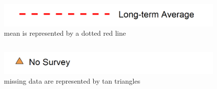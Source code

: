 \documentclass[
]{book}
\begin{document}
\begin{columns-nocenter}

\begin{column}

\begin{figure}
\includegraphics[width=15.25in]{figures/mline} \caption{mean is represented by a dotted red line}\label{fig:unnamed-chunk-177}
\end{figure}

\end{column}

\begin{column}

\begin{figure}
\includegraphics[width=15.25in]{figures/mpoint} \caption{missing data are represented by tan triangles}\label{fig:unnamed-chunk-178}
\end{figure}

\end{column}

\begin{column}

\end{column}

\end{columns-nocenter}
\end{document}
